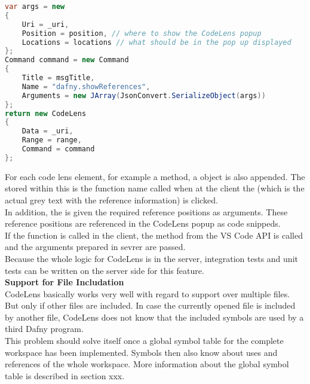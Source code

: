 \begin{lstlisting}[language=csharp, caption={LSP Handler Implementation}, captionpos=b, label={lst:codelens-prep}]
var args = new
{
    Uri = _uri,
    Position = position, // where to show the CodeLens popup
    Locations = locations // what should be in the pop up displayed
};
Command command = new Command
{
    Title = msgTitle,
    Name = "dafny.showReferences",
    Arguments = new JArray(JsonConvert.SerializeObject(args))
};
return new CodeLens
{
    Data = _uri,
    Range = range,
    Command = command
};
\end{lstlisting}

For each code lens element, for example a method, a  object is also appended.
The stored  within this 
is the function name called when at the client the 
(which is the actual grey text with the reference information) is clicked. \\

In addition, the  is given the required reference positions as arguments.
These reference positions are referenced in the CodeLens popup as code snippeds.  \\

If the function  is called in the client,
the method  from the VS Code API is called
and the arguments prepared in sevrer are passed. \\

Because the whole logic for CodeLens is in the server,
integration tests and unit tests can be written on the server side for this feature.\\

\textbf{Support for File Includation} \\
CodeLens basically works very well with regard to support over multiple files.
But only if other files are included.
In case the currently opened file is included by another file,
CodeLens does not know that the included symbols are used by a third Dafny program. \\

This problem should solve itself once a global symbol table for the complete workspace has been implemented.
Symbols then also know about uses and references of the whole workspace.
More information about the global symbol table is described in section xxx.

